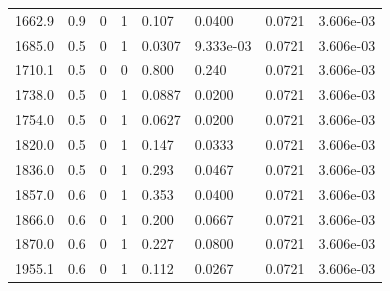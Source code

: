 \documentclass[preview]{standalone}
\begin{document}
{{{\begin{tabular}{L{1.2cm}C{1.2cm} C{0.3cm}C{0.5cm} C{1.4cm}C{1.4cm} C{1.4cm}C{1.4cm}}
  1662.9  &   0.9  & 0     &  1 &  0.107  & 0.0400  & 0.0721 &  3.606e-03   \\ 
  1685.0  &   0.5  & 0     &  1 &  0.0307  & 9.333e-03  & 0.0721 &  3.606e-03   \\ 
  1710.1  &   0.5  & 0     &  0 &  0.800  & 0.240  & 0.0721 &  3.606e-03   \\ 
  1738.0  &   0.5  & 0     &  1 &  0.0887  & 0.0200  & 0.0721 &  3.606e-03   \\ 
  1754.0  &   0.5  & 0     &  1 &  0.0627  & 0.0200  & 0.0721 &  3.606e-03   \\ 
  1820.0  &   0.5  & 0     &  1 &  0.147  & 0.0333  & 0.0721 &  3.606e-03   \\ 
  1836.0  &   0.5  & 0     &  1 &  0.293  & 0.0467  & 0.0721 &  3.606e-03   \\ 
  1857.0  &   0.6  & 0     &  1 &  0.353  & 0.0400  & 0.0721 &  3.606e-03   \\ 
  1866.0  &   0.6  & 0     &  1 &  0.200  & 0.0667  & 0.0721 &  3.606e-03   \\ 
  1870.0  &   0.6  & 0     &  1 &  0.227  & 0.0800  & 0.0721 &  3.606e-03   \\ 
  1955.1  &   0.6  & 0     &  1 &  0.112  & 0.0267  & 0.0721 &  3.606e-03   \\ 
\hline 
\end{tabular} 

}}}
\end{document}
